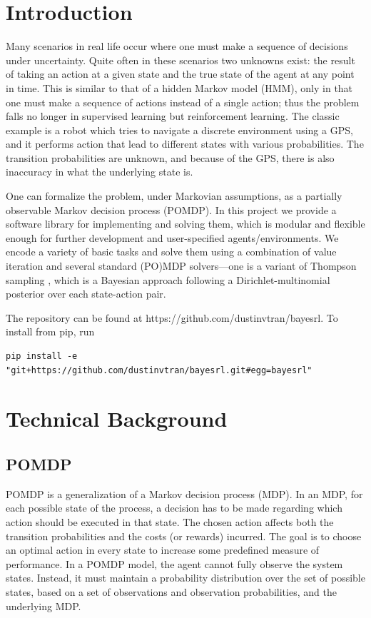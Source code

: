 \documentclass{pset}
\begin{document}

\section{Introduction}
Many scenarios in real life occur where one must make a sequence of decisions
under uncertainty. Quite often in these scenarios two unknowns exist: the
result of taking an action at a given state and the true state of the agent at
any point in time. This is similar to that of a hidden Markov model (HMM), only
in that one must make a sequence of actions instead of a single action; thus the
problem falls no longer in supervised learning but reinforcement learning. The
classic example is a robot which tries to navigate a discrete environment using a
GPS, and it performs action that lead to different states with various
probabilities. The transition probabilities are unknown, and because of the GPS,
there is also inaccuracy in what the
underlying state is.

One can formalize the problem, under Markovian assumptions, as a partially
observable Markov decision process (POMDP). In this project we provide a
software library for implementing and solving them, which is modular and
flexible enough for further development and user-specified agents/environments.
We encode a variety of basic tasks and solve them using a combination of value
iteration and several standard (PO)MDP solvers---one is a variant of Thompson
sampling \cite{strens2000bayesian}, which is a Bayesian approach following a
Dirichlet-multinomial posterior over each state-action pair.

The repository can be found at https://github.com/dustinvtran/bayesrl.
To install from pip, run
\begin{lstlisting}
pip install -e "git+https://github.com/dustinvtran/bayesrl.git#egg=bayesrl"
\end{lstlisting}

\section{Technical Background}

\subsection{POMDP}
POMDP is a generalization of a Markov decision process (MDP). In an MDP, for
each possible state of the process, a decision has to be made regarding which
action should be executed in that state. The chosen action affects both the
transition probabilities and the costs (or rewards) incurred. The goal is to
choose an optimal action in every state to increase some predefined measure of
performance. In a POMDP model, the agent cannot fully observe the system states.
Instead, it must maintain a probability distribution over the set of possible
states, based on a set of observations and observation probabilities, and the
underlying MDP.
\end{document}
